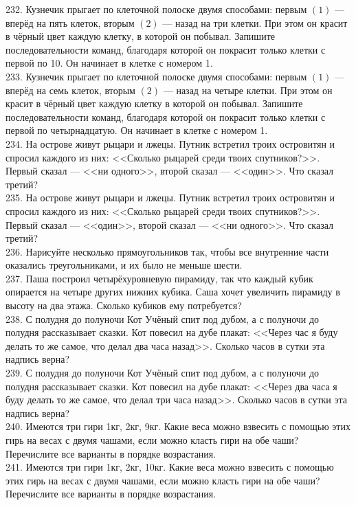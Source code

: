 232. Кузнечик прыгает по клеточной полоске двумя способами: первым $(1)$ --- вперёд на пять клеток, вторым $(2)$ --- назад на три клетки. При этом он красит в чёрный цвет каждую клетку,  в которой он побывал. Запишите последовательности команд, благодаря которой он покрасит только клетки с первой по 10. Он начинает в клетке с номером 1.\\
233. Кузнечик прыгает по клеточной полоске двумя способами: первым $(1)$ --- вперёд на семь клеток, вторым $(2)$ --- назад на четыре клетки. При этом он красит в чёрный цвет каждую клетку в которой он побывал. Запишите последовательности команд, благодаря которой он покрасит только клетки с первой по четырнадцатую. Он начинает в клетке с номером 1.\\
234. На острове живут рыцари и лжецы. Путник встретил троих островитян и спросил каждого из них: <<Сколько рыцарей среди твоих спутников?>>. Первый сказал --- <<ни одного>>,  второй сказал --- <<один>>. Что сказал третий?\\
235. На острове живут рыцари и лжецы. Путник встретил троих островитян и спросил каждого из них: <<Сколько рыцарей среди твоих спутников?>>. Первый сказал --- <<один>>,  второй сказал --- <<ни одного>>. Что сказал третий?\\
236. Нарисуйте несколько прямоугольников так, чтобы все внутренние части оказались треугольниками, и их было не меньше шести.\\
237. Паша построил четырёхуровневую пирамиду, так что каждый кубик опирается на четыре других нижних кубика. Саша хочет увеличить пирамиду в высоту на два этажа. Сколько кубиков ему потребуется?\\
238. С полудня до полуночи Кот Учёный спит под дубом, а с полуночи до полудня рассказывает сказки. Кот повесил на дубе плакат: <<Через час я буду делать то же самое, что делал два часа назад>>. Сколько часов в сутки эта надпись верна?\\
239. С полудня до полуночи Кот Учёный спит под дубом, а с полуночи до полудня рассказывает сказки. Кот повесил на дубе плакат: <<Через два часа я буду делать то же самое, что делал три часа назад>>. Сколько часов в сутки эта надпись верна?\\
240. Имеются три гири 1кг, 2кг, 9кг. Какие веса можно взвесить с помощью этих гирь на весах с двумя чашами, если можно класть гири на обе чаши? Перечислите все варианты в порядке возрастания.\\
241. Имеются три гири 1кг, 2кг, 10кг. Какие веса можно взвесить с помощью этих гирь на весах с двумя чашами, если можно класть гири на обе чаши? Перечислите все варианты в порядке возрастания.\\
